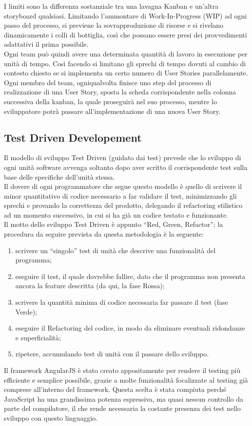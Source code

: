 I limiti sono la differenza sostanziale tra una lavagna Kanban e un’altra storyboard qualsiasi. Limitando l’ammontare di Work-In-Progress (WIP) ad ogni passo del processo, si previene la sovrapproduzione di risorse e si rivelano dinamicamente i colli di bottiglia, così che possano essere presi dei provvedimenti adattativi il prima possibile.\\
Ogni team può quindi avere una determinata quantità di lavoro in esecuzione per unità di tempo. Così facendo si limitano gli sprechi di tempo dovuti al cambio di contesto chiesto se si implementa un certo numero di User Stories parallelamente. Ogni membro del team, ogniqualvolta finisce uno step del processo di realizzazione di una User Story, sposta la scheda corrispondente nella colonna successiva della kanban, la quale proseguirà nel suo processo, mentre lo sviluppatore potrà passare all’implementazione di una nuova User Story.



\subsection{Test Driven Developement}
Il modello di sviluppo Test Driven (guidato dai test) prevede che lo sviluppo di ogni unità software avvenga soltanto dopo aver scritto il corrispondente test sulla base delle specifiche dell’unità stessa.\\
Il dovere di ogni programmatore che segue questo modello è quello di scrivere il minor quantitativo di codice necessario a far validare il test, minimizzando gli sprechi e provando la correttezza del prodotto, delegando il refactoring stilistico ad un momento successivo, in cui si ha già un codice testato e funzionante.\\
Il motto dello sviluppo Test Driven è appunto “Red, Green, Refactor”; la procedura da seguire prevista da questa metodologia è la seguente:
\begin{enumerate}
	\item scrivere un “singolo” test di unità che descrive una funzionalità del programma;
	\item eseguire il test, il quale dovrebbe fallire, dato che il programma non presenta ancora la feature descritta (da qui, la fase Rossa);
	\item scrivere la quantità minima di codice necessaria far passare il test (fase Verde);
	\item eseguire il Refactoring del codice, in modo da eliminare eventuali ridondanze e superficialità;
	\item ripetere, accumulando test di unità con il passare dello sviluppo.
\end{enumerate}
Il framework AngularJS è stato creato appositamente per rendere il testing più efficiente e semplice possibile, grazie a molte funzionalità focalizzate al testing già comprese all’interno del framework. Questa scelta è stata compiuta perché JavaScript ha una grandissima potenza espressiva, ma quasi nessun controllo da parte del compilatore, il che rende necessaria la costante presenza dei test nello sviluppo con questo linguaggio.
